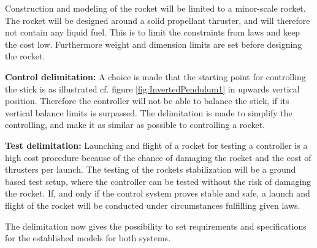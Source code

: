 Construction and modeling of the rocket will be limited to a minor-scale rocket. The rocket will be designed around a solid propellant thruster, and will therefore not contain any liquid fuel. This is to limit the constraints from laws and keep the cost low. Furthermore weight and dimension limits are set before designing the rocket.
 
 
\textbf{Control delimitation:}
A choice is made that the starting point for controlling the stick is as illustrated cf. figure \ref{fig:InvertedPendulum1} in upwards vertical position. Therefore the controller will not be able to balance the stick, if its vertical balance limits is surpassed. The delimitation is made to simplify the controlling, and make it as similar as possible to controlling a rocket. 
 
 
\textbf{Test delimitation:}
Launching and flight of a rocket for testing a controller is a high cost procedure because of the chance of damaging the rocket and the cost of thrusters per launch. The testing of the rockets stabilization will be a ground based test setup, where the controller can be tested without the risk of damaging the rocket. If, and only if the control system proves stable and safe, a launch and flight of the rocket will be conducted under circumstances fulfilling given laws.   
\bigbreak


The delimitation now gives the possibility to set requirements and specifications for the established models for both systems.